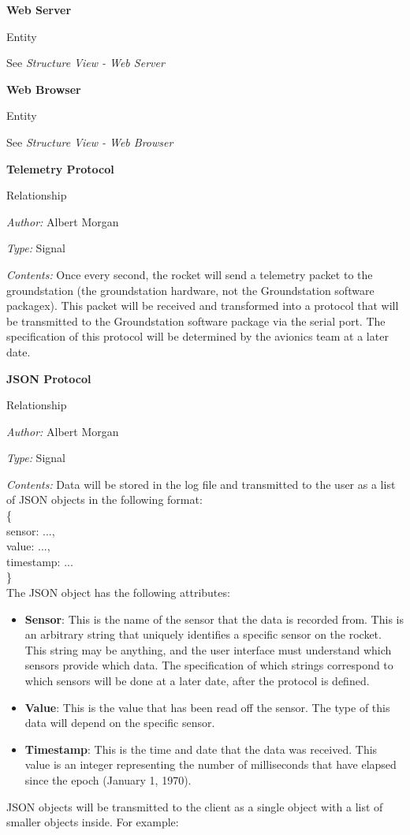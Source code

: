 \documentclass[10pt,draftclsnofoot,onecolumn]{IEEEtran}
\newcommand{\newrelationship}[4]{
	\noindent\textbf{#2}
	
	\noindent Relationship
	
	\noindent\textit{Author:} #1

	\noindent\textit{Type:} #3

	\noindent\textit{Contents:} #4

	\vspace{.5cm}
}
\newcommand{\entityref}[2]{

	\noindent\textbf{#1}
	
	\noindent Entity
	
	\noindent See \textit{#2}

	\vspace{.5cm}
}
\begin{document}
	\entityref{Web Server}
	{Structure View - Web Server}
	
	\entityref{Web Browser}
	{Structure View - Web Browser}
	


	\newrelationship
	{Albert Morgan}
	{Telemetry Protocol}
	{Signal}
	{
		Once every second, the rocket will send a telemetry packet to the groundstation
		(the groundstation hardware, not the Groundstation software packagex).
		This packet will be received and transformed into a protocol that will be transmitted to the
		Groundstation software package via the serial port.
		The specification of this protocol will be determined by the avionics team at a later date.
	}

		
	\newrelationship
	{Albert Morgan}
	{JSON Protocol}
	{Signal}
	{
		Data will be stored in the log file and transmitted to the user as a list of JSON objects in the following format:\\


\noindent\{\\
\hspace*{.5cm}sensor: ...,\\
\hspace*{.5cm}value: ...,\\
\hspace*{.5cm}timestamp: ...\\
\}\\

		The JSON object has the following attributes:
		\begin{itemize}
			\item\textbf{Sensor}: This is the name of the sensor that the data is recorded from.
			This is an arbitrary string that uniquely identifies a specific sensor on the rocket.
			This string may be anything, and the user interface must understand which sensors provide which data.
			The specification of which strings correspond to which sensors will be done at a later date, after the protocol is defined.
			\item\textbf{Value}: This is the value that has been read off the sensor.
			The type of this data will depend on the specific sensor.
			\item\textbf{Timestamp}: This is the time and date that the data was received.
			This value is an integer representing the number of milliseconds that have elapsed since the epoch (January 1, 1970).
		\end{itemize}
	
			JSON objects will be transmitted to the client as a single object with a list of smaller objects inside. For example:\\

}
\end{document}
